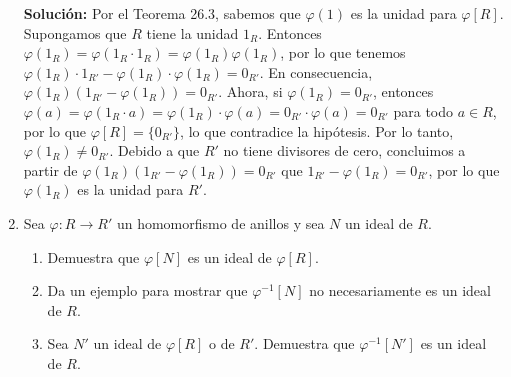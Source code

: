 \begin{enumerate}
\textbf{Solución:}
Por el Teorema 26.3, sabemos que \( \varphi(1) \) es la unidad para \( \varphi[R] \). Supongamos que \( R \) tiene la unidad \( 1_R \). Entonces \( \varphi(1_R) = \varphi(1_R \cdot 1_R) = \varphi(1_R) \varphi(1_R) \), por lo que tenemos \( \varphi(1_R) \cdot 1_{R'} - \varphi(1_R) \cdot \varphi(1_R) = 0_{R'} \). En consecuencia, \( \varphi(1_R)(1_{R'} - \varphi(1_R)) = 0_{R'} \). Ahora, si \( \varphi(1_R) = 0_{R'} \), entonces \( \varphi(a) = \varphi(1_R \cdot a) = \varphi(1_R) \cdot \varphi(a) = 0_{R'} \cdot \varphi(a) = 0_{R'} \) para todo \( a \in R \), por lo que \( \varphi[R] = \{0_{R'}\} \), lo que contradice la hipótesis. Por lo tanto, \( \varphi(1_R) \neq 0_{R'} \). Debido a que \( R' \) no tiene divisores de cero, concluimos a partir de \( \varphi(1_R)(1_{R'} - \varphi(1_R)) = 0_{R'} \) que \( 1_{R'} - \varphi(1_R) = 0_{R'} \), por lo que \( \varphi(1_R) \) es la unidad para \( R' \).

\item Sea \( \varphi : R \rightarrow R' \) un homomorfismo de anillos y sea \( N \) un ideal de \( R \).
    \begin{enumerate}
        \item Demuestra que \( \varphi[N] \) es un ideal de \( \varphi[R] \).
        \item Da un ejemplo para mostrar que \( \varphi^{-1}[N] \) no necesariamente es un ideal de \( R \).
        \item Sea \( N' \) un ideal de \( \varphi[R] \) o de \( R' \). Demuestra que \( \varphi^{-1}[N'] \) es un ideal de \( R \).
    \end{enumerate}


\end{enumerate}
